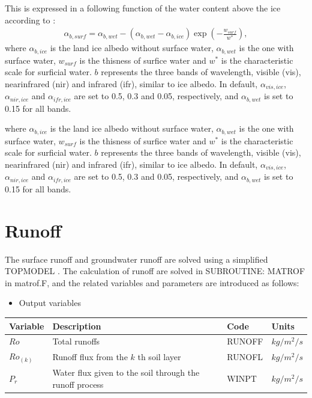 This is expressed in a following function of the water content above the ice according to \citet{Bougamont2005-pd}: \begin{eqnarray}
\alpha_{b,surf} = \alpha_{b,wet} - (\alpha_{b,wet}-\alpha_{b,ice}) \exp{\left( -\frac{w_{surf}}{w^{\ast}} \right)}, \label{8-66}
\end{eqnarray} where \(\alpha_{b,ice}\) is the land ice albedo without surface water, \(\alpha_{b,wet}\) is the one with surface water, \(w_{surf}\) is the thisness of surfice water and \(w^{\ast}\) is the
characteristic scale for surficial water. \(b\) represents the three bands of wavelength, visible (vis), nearinfrared (nir) and infrared (ifr), similar to ice albedo. In default, \(\alpha_{vis,ice}\),
\(\alpha_{nir,ice}\) and \(\alpha_{ifr,ice}\) are set to 0.5, 0.3 and 0.05, respectively, and \(\alpha_{b,wet}\) is set to 0.15 for all bands.

where \(\alpha_{b,ice}\) is the land ice albedo without surface water, \(\alpha_{b,wet}\) is the one with surface water, \(w_{surf}\) is the thisness of surfice water and \(w^{\ast}\) is the
characteristic scale for surficial water. \(b\) represents the three bands of wavelength, visible (vis), nearinfrared (nir) and infrared (ifr), similar to ice albedo. In default, \(\alpha_{vis,ice}\),
\(\alpha_{nir,ice}\) and \(\alpha_{ifr,ice}\) are set to 0.5, 0.3 and 0.05, respectively, and \(\alpha_{b,wet}\) is set to 0.15 for all bands.

\section{Runoff}\label{runoff}

The surface runoff and groundwater runoff are solved using a simplified TOPMODEL \citep{Beven1979-ia}. The calculation of runoff are solved in SUBROUTINE: MATROF in matrof.F, and the related variables
and parameters are introduced as follows:

\begin{itemize}
\tightlist
\item
  Output variables
\end{itemize}

\begin{longtable}[]{@{}llll@{}}
\toprule\noalign{}
Variable & Description & Code & Units \\
\midrule\noalign{}
\endhead
\bottomrule\noalign{}
\endlastfoot
\(Ro\) & Total runoffs & RUNOFF & \(kg/m^2/s\) \\
\(Ro_{(k)}\) & Runoff flux from the \(k\) th soil layer & RUNOFL & \(kg/m^2/s\) \\
\(P_r\) & Water flux given to the soil through the runoff process & WINPT & \(kg/m^2/s\) \\
\end{longtable}


